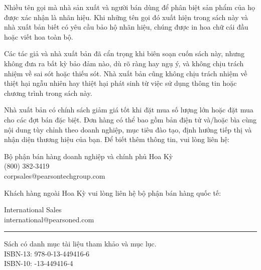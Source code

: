 \documentclass[10pt,twoside,openright]{book}
\begin{document}
\clearpage
\thispagestyle{empty}
\begingroup
\fontsize{8.5}{10.5}\selectfont
\setlength{\parindent}{0pt}
\noindent Nhiều tên gọi mà nhà sản xuất và người bán dùng để phân biệt sản phẩm
của họ được xác nhận là nhãn hiệu. Khi những tên gọi đó xuất hiện trong sách
này và nhà xuất bản biết có yêu cầu bảo hộ nhãn hiệu, chúng được in hoa chữ cái
đầu hoặc viết hoa toàn bộ.\par
\vspace{5pt}
\noindent Các tác giả và nhà xuất bản đã cẩn trọng khi biên soạn cuốn sách này,
nhưng không đưa ra bất kỳ bảo đảm nào, dù rõ ràng hay ngụ ý, và không chịu trách
nhiệm về sai sót hoặc thiếu sót. Nhà xuất bản cũng không chịu trách nhiệm về
thiệt hại ngẫu nhiên hay thiệt hại phát sinh từ việc sử dụng thông tin hoặc
chương trình trong sách này.\par
\vspace{5pt}
\noindent Nhà xuất bản có chính sách giảm giá tốt khi đặt mua số lượng lớn hoặc
đặt mua cho các đợt bán đặc biệt. Đơn hàng có thể bao gồm bản điện tử và/hoặc
bìa cùng nội dung tùy chỉnh theo doanh nghiệp, mục tiêu đào tạo, định hướng
tiếp thị và nhận diện thương hiệu của bạn. Để biết thêm thông tin, vui lòng
liên hệ:\par
\vspace{3pt}
\hspace*{20pt}Bộ phận bán hàng doanh nghiệp và chính phủ Hoa Kỳ\\
\hspace*{20pt}(800) 382-3419\\
\hspace*{20pt}corpsales@pearsontechgroup.com\par
\vspace{5pt}
\noindent Khách hàng ngoài Hoa Kỳ vui lòng liên hệ bộ phận bán hàng quốc tế:\par
\vspace{3pt}
\hspace*{20pt}International Sales\\
\hspace*{20pt}international@pearsoned.com\par
\vspace{16pt}
\noindent\rule{\textwidth}{0.5pt}\par
\vfill
\noindent Sách có danh mục tài liệu tham khảo và mục lục.\\
ISBN-13: 978-0-13-449416-6\\
ISBN-10: -13-449416-4\par
\end{document}
